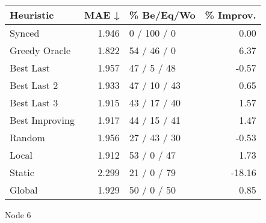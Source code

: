 \begin{tabular}{lrlr}
\toprule
\textbf{Heuristic} & \textbf{MAE ↓} & \textbf{\% Be/Eq/Wo} & \textbf{\% Improv.} \\
\midrule
            Synced &          1.946 &          0 / 100 / 0 &                0.00 \\
     Greedy Oracle &          1.822 &          54 / 46 / 0 &                6.37 \\
         Best Last &          1.957 &          47 / 5 / 48 &               -0.57 \\
       Best Last 2 &          1.933 &         47 / 10 / 43 &                0.65 \\
       Best Last 3 &          1.915 &         43 / 17 / 40 &                1.57 \\
    Best Improving &          1.917 &         44 / 15 / 41 &                1.47 \\
            Random &          1.956 &         27 / 43 / 30 &               -0.53 \\
             Local &          1.912 &          53 / 0 / 47 &                1.73 \\
            Static &          2.299 &          21 / 0 / 79 &              -18.16 \\
            Global &          1.929 &          50 / 0 / 50 &                0.85 \\
\bottomrule
\end{tabular}
\caption{Node 6}
\label{tab:ds_non_lr05_le2_bs2_6}
